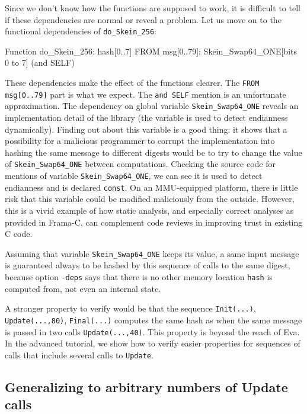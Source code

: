\documentclass[web]{frama-c-book}
\newcommand{\Eva}{\textsf{Eva}}
\begin{document}
Since we don't know how the functions are supposed to work, 
it is difficult to tell if these 
dependencies are normal or reveal a problem. Let us move on to the
functional dependencies of \lstinline|do_Skein_256|:
\begin{logs}
Function do_Skein_256:
  hash[0..7] FROM msg[0..79]; Skein_Swap64_ONE[bits 0 to 7] (and SELF)
\end{logs}

These dependencies make the effect of the functions clearer.  The
\verb|FROM msg[0..79]| part is what we expect.  The
\verb|and SELF| mention is an unfortunate approximation.  The
dependency on global variable \verb|Skein_Swap64_ONE| reveals an implementation
detail of the library (the variable is used to detect endianness
dynamically). Finding out about this variable is a good thing: it
shows that a possibility for a malicious programmer to corrupt the
implementation into hashing the same message to different digests
would be to try to change the value of \verb|Skein_Swap64_ONE| between
computations.  Checking the source code for mentions of variable 
\lstinline|Skein_Swap64_ONE|, we can see it is used to
detect endianness and is declared \lstinline|const|. On an
MMU-equipped platform, there is little risk that this variable
could be modified maliciously from the outside. 
However, this is a vivid example of how static
analysis, and especially correct analyses as provided in Frama-C, can
complement code reviews in improving trust in existing C code.

Assuming that variable \lstinline|Skein_Swap64_ONE| keeps its value, a same
input message is guaranteed always to be hashed by this 
sequence of calls to the same digest,
because option \verb|-deps| says that there is no other
memory location \lstinline|hash| is computed from, not even an
internal state.

A stronger property to verify would be that the 
sequence \lstinline|Init(...)|, \lstinline|Update(...,80)|,
\lstinline|Final(...)| computes the same hash as when the
same message is passed in two calls \lstinline|Update(...,40)|.
This property is beyond the reach of \Eva{}.
In the advanced tutorial, we show how to verify easier properties
for sequences of calls that include several calls
to \lstinline|Update|.

\subsection{Generalizing to arbitrary numbers of Update calls}
\end{document}
